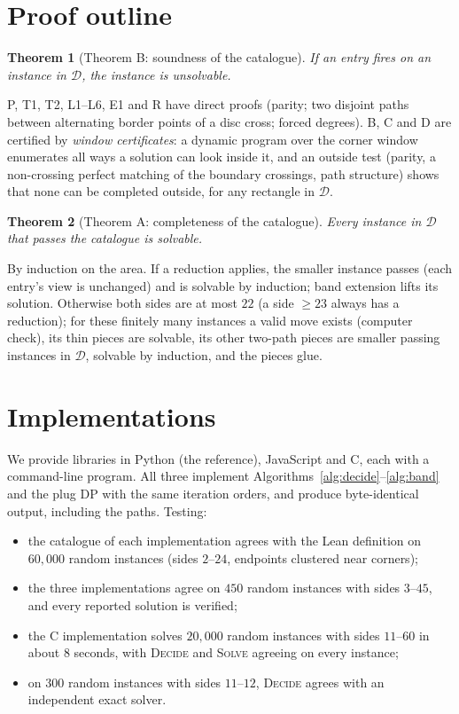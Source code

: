 \documentclass[11pt]{article}
\newtheorem{theorem}{Theorem}
\newcommand{\Dom}{\mathcal{D}}
\begin{document}
\section{Proof outline}\label{sec:proof}

\begin{theorem}[Theorem B: soundness of the catalogue]
If an entry fires on an instance in $\Dom$, the instance is unsolvable.
\end{theorem}
P, T1, T2, L1--L6, E1 and R have direct proofs (parity; two disjoint paths between alternating
border points of a disc cross; forced degrees). B, C and D are certified by \emph{window
certificates}: a dynamic program over the corner window enumerates all ways a solution can look
inside it, and an outside test (parity, a non-crossing perfect matching of the boundary crossings,
path structure) shows that none can be completed outside, for any rectangle in $\Dom$.

\begin{theorem}[Theorem A: completeness of the catalogue]
Every instance in $\Dom$ that passes the catalogue is solvable.
\end{theorem}
By induction on the area. If a reduction applies, the smaller instance passes (each entry's view is
unchanged) and is solvable by induction; band extension lifts its solution. Otherwise both sides
are at most $22$ (a side $\ge 23$ always has a reduction); for these finitely many instances a valid
move exists (computer check), its thin pieces are solvable, its other two-path pieces are smaller
passing instances in $\Dom$, solvable by induction, and the pieces glue.

\section{Implementations}\label{sec:impl}

We provide libraries in Python (the reference), JavaScript and C, each with a command-line program.
All three implement Algorithms~\ref{alg:decide}--\ref{alg:band} and the plug DP with the same
iteration orders, and produce byte-identical output, including the paths. Testing:
\begin{itemize}
\item the catalogue of each implementation agrees with the Lean definition on $60{,}000$ random
  instances (sides $2$--$24$, endpoints clustered near corners);
\item the three implementations agree on $450$ random instances with sides $3$--$45$, and every
  reported solution is verified;
\item the C implementation solves $20{,}000$ random instances with sides $11$--$60$ in about
  $8$ seconds, with \textsc{Decide} and \textsc{Solve} agreeing on every instance;
\item on $300$ random instances with sides $11$--$12$, \textsc{Decide} agrees with an independent
  exact solver.
\end{itemize}
\end{document}
